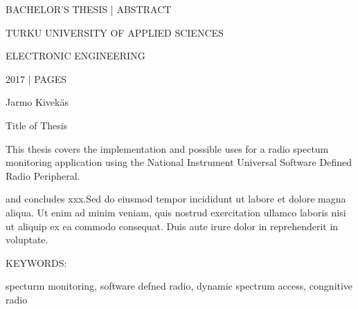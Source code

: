 BACHELOR'S THESIS | ABSTRACT

TURKU UNIVERSITY OF APPLIED SCIENCES

ELECTRONIC ENGINEERING

2017 | \pageref{LastPage} PAGES


\vspace{10mm}
{\Large Jarmo Kivekäs \par}

\vspace{10mm}
{\huge Title of Thesis \par}

\vspace{10mm}

This thesis covers the implementation and possible uses for a radio spectum monitoring
application using the National Instrument Universal Software Defined Radio Peripheral.


and concludes xxx.Sed do eiusmod tempor
incididunt ut labore et dolore magna aliqua. Ut enim ad minim veniam,
quis nostrud exercitation ullamco laboris nisi ut aliquip ex ea commodo
consequat. Duis aute irure dolor in reprehenderit in voluptate.

\vspace{30mm}

KEYWORDS:

specturm monitoring, software defned radio, dynamic spectrum access, congnitive radio
